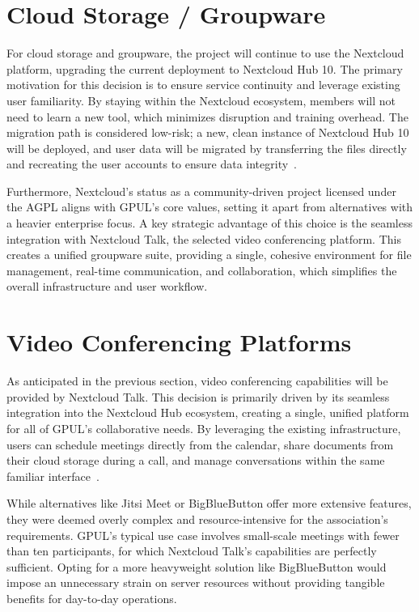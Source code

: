 \section{Cloud Storage / Groupware}

For cloud storage and groupware, the project will continue to use the Nextcloud platform, upgrading the current deployment to Nextcloud Hub 10. The primary motivation for this decision is to ensure service continuity and leverage existing user familiarity. By staying within the Nextcloud ecosystem, members will not need to learn a new tool, which minimizes disruption and training overhead. The migration path is considered low-risk; a new, clean instance of Nextcloud Hub 10 will be deployed, and user data will be migrated by transferring the files directly and recreating the user accounts to ensure data integrity~\cite{nextcloud-docs}.

Furthermore, Nextcloud's status as a community-driven project licensed under the AGPL aligns with GPUL's core values, setting it apart from alternatives with a heavier enterprise focus. A key strategic advantage of this choice is the seamless integration with Nextcloud Talk, the selected video conferencing platform. This creates a unified groupware suite, providing a single, cohesive environment for file management, real-time communication, and collaboration, which simplifies the overall infrastructure and user workflow.

\section{Video Conferencing Platforms}

As anticipated in the previous section, video conferencing capabilities will be provided by Nextcloud Talk. This decision is primarily driven by its seamless integration into the Nextcloud Hub ecosystem, creating a single, unified platform for all of GPUL's collaborative needs. By leveraging the existing infrastructure, users can schedule meetings directly from the calendar, share documents from their cloud storage during a call, and manage conversations within the same familiar interface~\cite{nextcloud-talk-docs}.

While alternatives like Jitsi Meet or BigBlueButton offer more extensive features, they were deemed overly complex and resource-intensive for the association's requirements. GPUL's typical use case involves small-scale meetings with fewer than ten participants, for which Nextcloud Talk's capabilities are perfectly sufficient. Opting for a more heavyweight solution like BigBlueButton would impose an unnecessary strain on server resources without providing tangible benefits for day-to-day operations.

